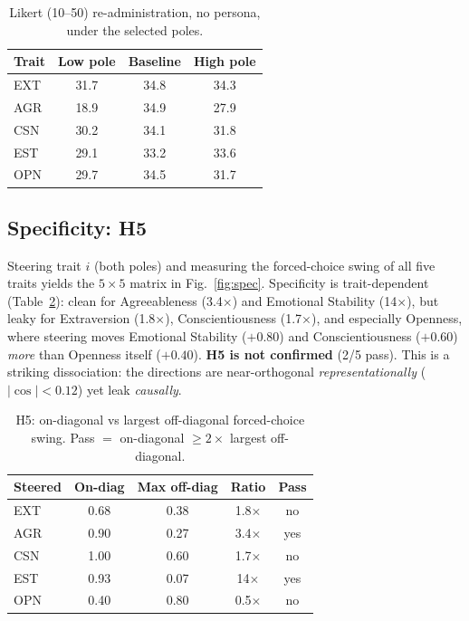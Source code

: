 \documentclass[11pt]{article}
\begin{document}
\begin{table}[h]\centering\small
\caption{Likert (10--50) re-administration, no persona, under the selected poles.}
\label{tab:likert}
\begin{tabular}{@{}lccc@{}}
\toprule
Trait & Low pole & Baseline & High pole \\
\midrule
EXT & 31.7 & 34.8 & 34.3 \\
AGR & 18.9 & 34.9 & 27.9 \\
CSN & 30.2 & 34.1 & 31.8 \\
EST & 29.1 & 33.2 & 33.6 \\
OPN & 29.7 & 34.5 & 31.7 \\
\bottomrule
\end{tabular}
\end{table}

\subsection{Specificity: H5}
Steering trait $i$ (both poles) and measuring the forced-choice swing of all five
traits yields the $5\times5$ matrix in Fig.~\ref{fig:spec}. Specificity is
trait-dependent (Table~\ref{tab:h5}): clean for Agreeableness (3.4$\times$) and
Emotional Stability (14$\times$), but leaky for Extraversion (1.8$\times$),
Conscientiousness (1.7$\times$), and especially Openness, where steering moves
Emotional Stability ($+0.80$) and Conscientiousness ($+0.60$) \emph{more} than
Openness itself ($+0.40$). \textbf{H5 is not confirmed} (2/5 pass). This is a
striking dissociation: the directions are near-orthogonal
\emph{representationally} ($|\cos|<0.12$) yet leak \emph{causally}.

\begin{table}[h]\centering\small
\caption{H5: on-diagonal vs largest off-diagonal forced-choice swing. Pass $=$
on-diagonal $\ge 2\times$ largest off-diagonal.}
\label{tab:h5}
\begin{tabular}{@{}lcccc@{}}
\toprule
Steered & On-diag & Max off-diag & Ratio & Pass \\
\midrule
EXT & 0.68 & 0.38 & 1.8$\times$ & no \\
AGR & 0.90 & 0.27 & 3.4$\times$ & \textcolor{pass}{yes} \\
CSN & 1.00 & 0.60 & 1.7$\times$ & no \\
EST & 0.93 & 0.07 & 14$\times$ & \textcolor{pass}{yes} \\
OPN & 0.40 & 0.80 & 0.5$\times$ & no \\
\bottomrule
\end{tabular}
\end{table}
\end{document}
